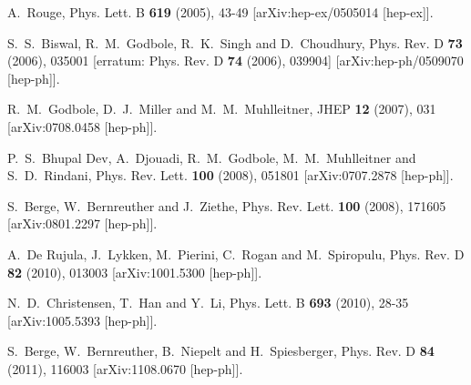 \documentclass[pdftex,twocolumn,epjc3]{svjour3}          %
\begin{document}
\begin{thebibliography}{9}
A.~Rouge,
Phys. Lett. B \textbf{619} (2005), 43-49
[arXiv:hep-ex/0505014 [hep-ex]].

S.~S.~Biswal, R.~M.~Godbole, R.~K.~Singh and D.~Choudhury,
Phys. Rev. D \textbf{73} (2006), 035001
[erratum: Phys. Rev. D \textbf{74} (2006), 039904]
[arXiv:hep-ph/0509070 [hep-ph]].

R.~M.~Godbole, D.~J.~Miller and M.~M.~Muhlleitner,
JHEP \textbf{12} (2007), 031
[arXiv:0708.0458 [hep-ph]].

P.~S.~Bhupal Dev, A.~Djouadi, R.~M.~Godbole, M.~M.~Muhlleitner and S.~D.~Rindani,
Phys. Rev. Lett. \textbf{100} (2008), 051801
[arXiv:0707.2878 [hep-ph]].

S.~Berge, W.~Bernreuther and J.~Ziethe,
Phys. Rev. Lett. \textbf{100} (2008), 171605
[arXiv:0801.2297 [hep-ph]].

A.~De Rujula, J.~Lykken, M.~Pierini, C.~Rogan and M.~Spiropulu,
Phys. Rev. D \textbf{82} (2010), 013003
[arXiv:1001.5300 [hep-ph]].

N.~D.~Christensen, T.~Han and Y.~Li,
Phys. Lett. B \textbf{693} (2010), 28-35
[arXiv:1005.5393 [hep-ph]].

S.~Berge, W.~Bernreuther, B.~Niepelt and H.~Spiesberger,
Phys. Rev. D \textbf{84} (2011), 116003
[arXiv:1108.0670 [hep-ph]].


\end{thebibliography}
\end{document}
